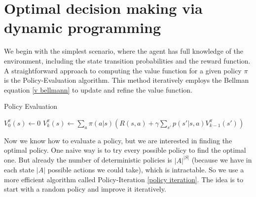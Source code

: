 \section{Optimal decision making via dynamic programming}\label{dynammic programming}
We begin with the simplest scenario, where the agent has full knowledge of the environment, 
including the state transition probabilities and the reward function. A straightforward approach 
to computing the value function for a given policy $\pi$ is the Policy-Evaluation algorithm. 
This method iteratively employs the Bellman equation \eqref{v bellmann} to update and refine the value function.
\begin{algorithm}[H]
   \large
    \caption{Policy Evaluation}\label{policy evaluation}
    \begin{algorithmic}
        \STATE  $V_0^{\pi}(s) \gets 0 $
                \STATE $ V_k^{\pi}(s) \gets  \sum_a \pi(a|s)\left(R(s,a)+\gamma \sum_{s'} p(s'|s,a)V_{k-1}^{\pi}(s')\right) $
            \ENDFOR
        \ENDFOR
    \end{algorithmic}
\end{algorithm}
Now we know how to evaluate a policy, but we are interested in finding 
the optimal policy. One naive way is to try every possible policy to find the 
optimal one. But already the number of deterministic policies is $|A|^{|S|}$ 
(because we have in each state $|A|$ possible actions we could take), which is 
intractable. So we use a more efficient algorithm called Policy-Iteration
\eqref{policy iteration}. The idea is to start with a random policy and 
improve it iteratively. 

